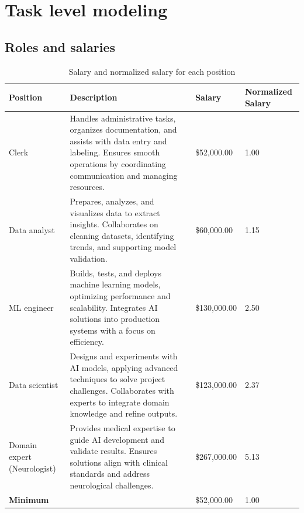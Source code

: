 \section{Task level modeling}

\subsection{Roles and salaries}

\begin{table}[H]
\centering
\begin{tabularx}{\textwidth}{|p{2.3cm}|X|l|m{2.2cm}|}
\hline
\textbf{Position} & \textbf{Description} & \textbf{Salary} & \textbf{Normalized Salary} \\
\hline
Clerk & Handles administrative tasks, organizes documentation, and assists with data entry and labeling.
Ensures smooth operations by coordinating communication and managing resources. & \$52,000.00 & 1.00 \\
\hline
Data analyst & Prepares, analyzes, and visualizes data to extract insights. 
Collaborates on cleaning datasets, identifying trends, and supporting model validation. & \$60,000.00 & 1.15 \\
\hline
ML engineer & Builds, tests, and deploys machine learning models, optimizing performance and scalability. 
Integrates AI solutions into production systems with a focus on efficiency. & \$130,000.00 & 2.50 \\
\hline
Data scientist & Designs and experiments with AI models, applying advanced techniques to solve project challenges. 
Collaborates with experts to integrate domain knowledge and refine outputs. & \$123,000.00 & 2.37 \\
\hline
Domain expert (Neurologist) & Provides medical expertise to guide AI development and validate results. 
Ensures solutions align with clinical standards and address neurological challenges. & \$267,000.00 & 5.13 \\
\hline
\multicolumn{2}{|l|}{\textbf{Minimum}} & \$52,000.00 & 1.00 \\
\hline
\end{tabularx}
\caption{Salary and normalized salary for each position}
\label{table:salary}
\end{table}

